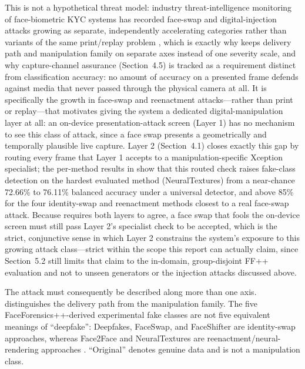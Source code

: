 This is not a hypothetical threat model: industry threat-intelligence
monitoring of face-biometric KYC systems has recorded face-swap and
digital-injection attacks growing as separate, independently accelerating
categories rather than variants of the same print/replay problem
\cite{iproov2025threat}, which is exactly why  keeps
delivery path and manipulation family on separate axes instead of one severity
scale, and why capture-channel assurance (Section~4.5) is tracked as a
requirement distinct from classification accuracy: no amount of accuracy on a
presented frame defends against media that never passed through the physical
camera at all. It is specifically the growth in face-swap and
reenactment attacks---rather than print or replay---that motivates giving the
system a dedicated digital-manipulation layer at all: an on-device
presentation-attack screen (Layer 1) has no mechanism to see this class of
attack, since a face swap presents a geometrically and temporally plausible
live capture. Layer 2 (Section~4.1) closes exactly this gap by routing every
frame that Layer 1 accepts to a manipulation-specific Xception specialist; the
per-method results in  show that this routed check
raises fake-class detection on the hardest evaluated method (NeuralTextures)
from a near-chance 72.66\% to 76.11\% balanced accuracy under a universal
detector, and above 85\% for the four identity-swap and reenactment methods
closest to a real face-swap attack. Because 
requires both layers to agree, a face swap that fools the on-device screen must
still pass Layer 2's specialist check to be accepted, which is the strict,
conjunctive sense in which Layer 2 constrains the system's exposure to this
growing attack class---strict within the scope this report can actually claim,
since Section~5.2 still limits that claim to the in-domain, group-disjoint FF++
evaluation and not to unseen generators or the injection attacks discussed
above.

The attack must consequently be described along more than one axis.
 distinguishes the delivery path from the manipulation family.
The five FaceForensics++-derived experimental fake classes are not five equivalent
meanings of ``deepfake'': Deepfakes, FaceSwap, and FaceShifter are identity-swap
approaches, whereas Face2Face and NeuralTextures are reenactment/neural-rendering
approaches \cite{rossler2019faceforensics,li2020faceshifter}. ``Original'' denotes
genuine data and is not a manipulation class.

